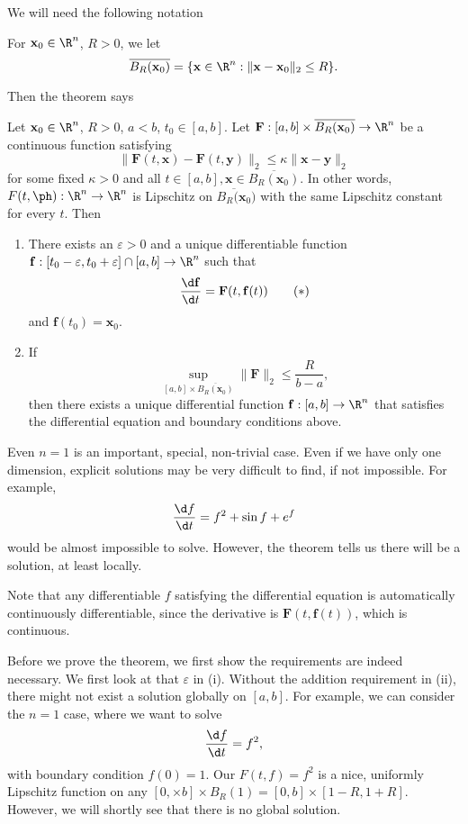 \documentclass[a4paper]{article}
\begin{document}
We will need the following notation
\begin{notation}
  For $\mathbf{x}_0 \in \R^n$, $R > 0$, we let
  \[
    \overline{B_R(\mathbf{x}_0)} = \{\mathbf{x} \in \R^n: \|\mathbf{x} - \mathbf{x}_0\|_2 \leq R\}.
  \]
\end{notation}
Then the theorem says
\begin{thm}
  Let $\mathbf{x}_0 \in \R^n$, $R > 0$, $a < b$, $t_0 \in [a, b]$. Let $\mathbf{F}: [a, b] \times \overline{B_R(\mathbf{x}_0)} \to \R^n$ be a continuous function satisfying
  \[
    \|\mathbf{F}(t, \mathbf{x}) - \mathbf{F}(t, \mathbf{y})\|_2 \leq \kappa\|\mathbf{x} - \mathbf{y}\|_2
  \]
  for some fixed $\kappa > 0$ and all $t \in [a, b], \mathbf{x} \in \overline{B_R(\mathbf{x}_0)}$. In other words, $F(t, \ph): \R^n \to \R^n$ is Lipschitz on $\overline{B_R(\mathbf{x}_0})$ with the same Lipschitz constant for every $t$. Then
  \begin{enumerate}
    \item There exists an $\varepsilon > 0$ and a unique differentiable function $\mathbf{f}: [t_0 - \varepsilon, t_0 + \varepsilon] \cap [a, b] \to \R^n$ such that
      \[
        \frac{\d \mathbf{f}}{\d t} = \mathbf{F}(t, \mathbf{f}(t))\tag{$*$}
      \]
      and $\mathbf{f}(t_0) = \mathbf{x}_0$.
    \item If
      \[
        \sup_{[a, b] \times \overline{B_R(\mathbf{x}_0)}} \|\mathbf{F}\|_2 \leq \frac{R}{b - a},
      \]
      then there exists a unique differential function $\mathbf{f}: [a, b] \to \R^n$ that satisfies the differential equation and boundary conditions above.
  \end{enumerate}
\end{thm}
Even $n = 1$ is an important, special, non-trivial case. Even if we have only one dimension, explicit solutions may be very difficult to find, if not impossible. For example,
\[
  \frac{\d f}{\d t} = f^2 + \sin f + e^f
\]
would be almost impossible to solve. However, the theorem tells us there will be a solution, at least locally.

Note that any differentiable $f$ satisfying the differential equation is automatically continuously differentiable, since the derivative is $\mathbf{F}(t, \mathbf{f}(t))$, which is continuous.

Before we prove the theorem, we first show the requirements are indeed necessary. We first look at that $\varepsilon$ in (i). Without the addition requirement in (ii), there might not exist a solution globally on $[a, b]$. For example, we can consider the $n = 1$ case, where we want to solve
\[
  \frac{\d f}{\d t} = f^2,
\]
with boundary condition $f(0) = 1$. Our $F(t, f) = f^2$ is a nice, uniformly Lipschitz function on any $[0, \times b] \times B_R(1) = [0, b] \times [1 - R, 1 + R]$. However, we will shortly see that there is no global solution.
\end{document}
